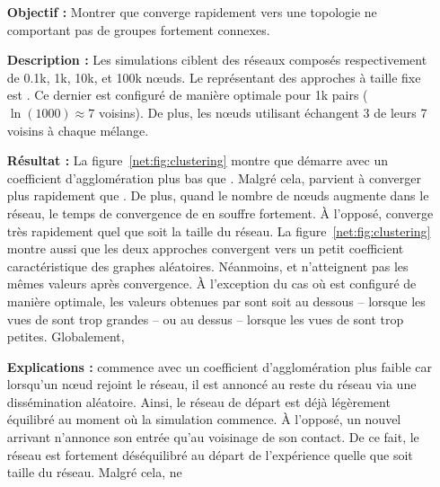 \begin{itemize}
\item [\textbf{Objectif :}] Montrer que \SPRAY converge rapidement vers une
  topologie ne comportant pas de groupes fortement connexes.
\item [\textbf{Description :}] Les simulations ciblent des réseaux composés
  respectivement de 0.1k, 1k, 10k, et 100k nœuds. Le représentant des approches
  à taille fixe est \CYCLON. Ce dernier est configuré de manière optimale pour
  1k pairs ($\ln(1000)\approx 7$ voisins). De plus, les nœuds utilisant \CYCLON
  échangent 3 de leurs 7 voisins à chaque mélange.
\item [\textbf{Résultat :}] La figure~\ref{net:fig:clustering} montre que
  \CYCLON démarre avec un coefficient d'agglomération plus bas que
  \SPRAY. Malgré cela, \SPRAY parvient à converger plus rapidement que
  \CYCLON. De plus, quand le nombre de nœuds augmente dans le réseau, le temps
  de convergence de \CYCLON en souffre fortement. À l'opposé, \SPRAY converge
  très rapidement quel que soit la taille du réseau. La
  figure~\ref{net:fig:clustering} montre aussi que les deux approches convergent
  vers un petit coefficient caractéristique des graphes aléatoires. Néanmoins,
  \CYCLON et \SPRAY n'atteignent pas les mêmes valeurs après convergence. À
  l'exception du cas où \CYCLON est configuré de manière optimale, les valeurs
  obtenues par \SPRAY sont soit au dessous -- lorsque les vues de \CYCLON sont
  trop grandes -- ou au dessus -- lorsque les vues de \CYCLON sont trop
  petites. Globalement, \SPRAY
\item [\textbf{Explications :}] \CYCLON commence avec un coefficient
  d'agglomération plus faible car lorsqu'un nœud rejoint le réseau, il est
  annoncé au reste du réseau via une dissémination aléatoire. Ainsi, le réseau
  de départ est déjà légèrement équilibré au moment où la simulation commence. À
  l'opposé, un nouvel arrivant \SPRAY n'annonce son entrée qu'au voisinage de
  son contact. De ce fait, le réseau est fortement déséquilibré au départ de
  l'expérience quelle que soit taille du réseau. Malgré cela, \CYCLON ne

\end{itemize}
